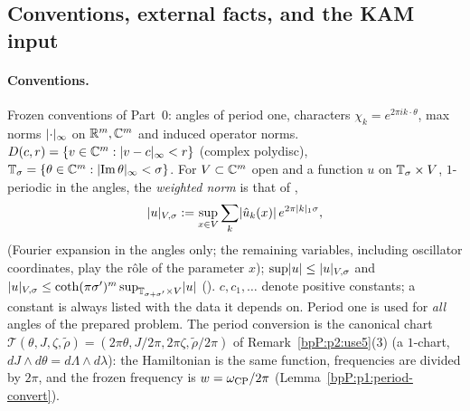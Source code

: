 \subsection{Conventions, external facts, and the KAM input}\label{bpP:p11:sec-conv}

\paragraph{Conventions.} Frozen conventions of Part~0: angles of period one, characters $\chi_k=e^{2\pi ik\cdot\theta}$, max norms $\lvert \cdot\rvert_\infty$ on $\mathbb{R}^m,\mathbb{C}^m$ and induced operator norms. $D(c,r)=\{v\in\mathbb{C}^m:\lvert v-c\rvert_\infty<r\}$ (complex polydisc), $\mathbb{T}_\sigma=\{\theta\in\mathbb{C}^m:\lvert \operatorname{Im}\theta\rvert_\infty<\sigma\}$. For $V\subset\mathbb{C}^m$ open and a function $u$ on $\mathbb{T}_\sigma\times V$, $1$-periodic in the angles, the \emph{weighted norm} is that of ,
\[\lvert u\rvert_{V,\sigma}:=\sup_{x\in V}\sum_{k}\lvert \hat u_k(x)\rvert\,e^{2\pi\lvert k\rvert_1\sigma},\]
(Fourier expansion in the angles only; the remaining variables, including oscillator coordinates, play the r\^ole of the parameter $x$); $\sup\lvert u\rvert\le\lvert u\rvert_{V,\sigma}$ and $\lvert u\rvert_{V,\sigma}\le\coth(\pi\sigma')^{m}\sup_{\mathbb{T}_{\sigma+\sigma'}\times V}\lvert u\rvert$ (). $c,c_1,\dots$ denote positive constants; a constant is always listed with the data it depends on. Period one is used for \emph{all} angles of the prepared problem. The period conversion is the canonical chart $\mathcal T(\theta,J,\zeta,\tilde\rho)=(2\pi\theta,J/2\pi,2\pi\zeta,\tilde\rho/2\pi)$ of Remark~\ref{bpP:p2:use5}(3) (a $1$-chart, $dJ\wedge d\theta=d\Lambda\wedge d\lambda$): the Hamiltonian is the same function, frequencies are divided by $2\pi$, and the frozen frequency is $w=\omega_{\rm CP}/2\pi$ (Lemma~\ref{bpP:p1:period-convert}).

